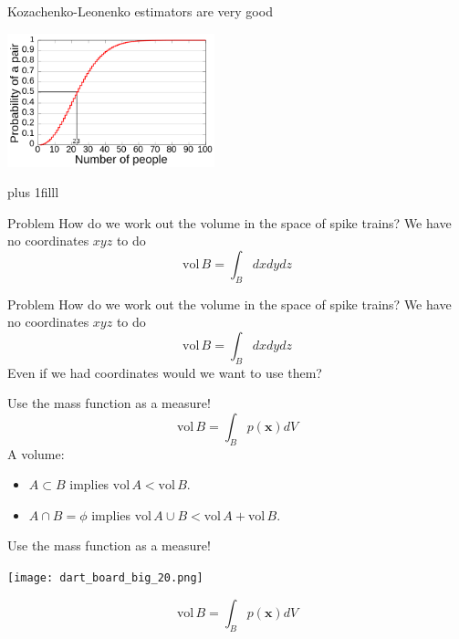 \documentclass{beamer}
\newcommand{\btVFill}{\vskip0pt plus 1filll}
\begin{document}
\begin{frame}{Kozachenko-Leonenko estimators are very good}
\color{reddish}
\begin{center}
\includegraphics[width=6cm]{Birthday_Paradox.png}
\end{center}
\color{black}
\btVFill
\color{gray}
\color{black}
\end{frame}



\begin{frame}{Problem}
\color{black}
How do we work out the volume in the space of spike trains? We have no coordinates $xyz$ to do
\color{dark}
$$\mbox{vol}\,B=\int_B dxdydz$$
\end{frame}


\begin{frame}{Problem}
\color{black}
How do we work out the volume in the space of spike trains? We have no coordinates $xyz$ to do
\color{dark}
$$\mbox{vol}\,B=\int_B dxdydz$$
\color{black}
Even if we had coordinates would we want to use them?
\end{frame}



\begin{frame}{Use the mass function as a measure!}
\color{dark}
$$\mbox{vol}\,B=\int_B p(\mathbf{x}) dV$$
\color{black}
A volume: 
\begin{itemize}
\item $A\subset B$ implies $\mbox{vol}\,A<\mbox{vol}\,B$.
\item $A\cap B=\phi$ implies $\mbox{vol}\,A\cup B<\mbox{vol}\,A+\mbox{vol}\,B$.
\end{itemize}
\end{frame}


\begin{frame}{Use the mass function as a measure!}
\color{reddish}
\begin{center}
\texttt{[image: dart\_board\_big\_20.png]}
\end{center}
\color{dark}
$$\mbox{vol}\,B=\int_B p(\mathbf{x}) dV$$
\color{black}
\end{frame}
\end{document}
